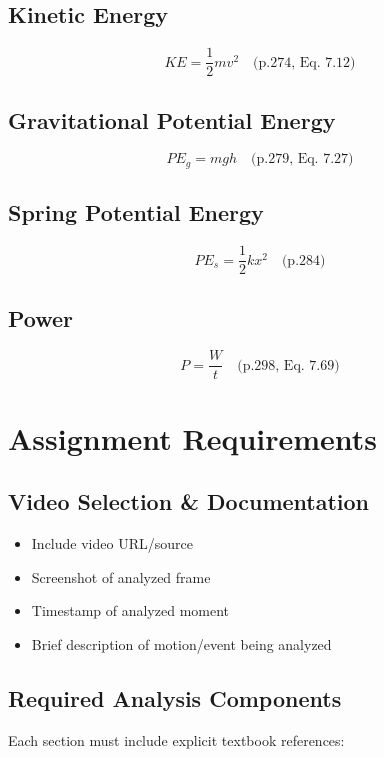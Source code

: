 \documentclass[12pt]{article}
\begin{document}
\subsection{Kinetic Energy}
\begin{equation}
KE = \frac{1}{2}mv^2 \quad \text{(p.274, Eq. 7.12)}
\end{equation}

\subsection{Gravitational Potential Energy}
\begin{equation}
PE_g = mgh \quad \text{(p.279, Eq. 7.27)}
\end{equation}

\subsection{Spring Potential Energy}
\begin{equation}
PE_s = \frac{1}{2}kx^2 \quad \text{(p.284)}
\end{equation}

\subsection{Power}
\begin{equation}
P = \frac{W}{t} \quad \text{(p.298, Eq. 7.69)}
\end{equation}

\section{Assignment Requirements}

\subsection{Video Selection \& Documentation}
\begin{itemize}
\item Include video URL/source
\item Screenshot of analyzed frame
\item Timestamp of analyzed moment
\item Brief description of motion/event being analyzed
\end{itemize}

\subsection{Required Analysis Components}
Each section must include explicit textbook references:
\end{document}

